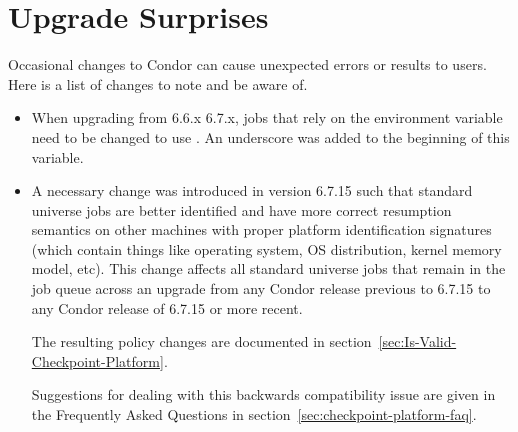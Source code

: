 \section{\label{sec:gotchas}Upgrade Surprises}

Occasional changes to Condor can cause unexpected errors or results
to users.
Here is a list of changes to note and be aware of.

\begin{itemize}

\item When upgrading from 6.6.x 6.7.x,
  jobs that rely on the environment variable 
  need to be changed to use .
  An underscore was added to the beginning of this variable.

\item A necessary change was introduced in version 6.7.15 such that
  standard universe jobs are better identified and have more
  correct resumption semantics on other machines with proper platform
  identification signatures (which contain things like operating system,
  OS distribution, kernel memory model, etc). This change affects all
  standard universe jobs that remain in the job queue across an upgrade
  from any Condor release previous to 6.7.15 to any Condor release of
  6.7.15 or more recent.

  The resulting policy changes are documented in
  section~\ref{sec:Is-Valid-Checkpoint-Platform}.

  Suggestions for dealing with this backwards compatibility issue
  are given in the Frequently Asked Questions in
  section~\ref{sec:checkpoint-platform-faq}.


\end{itemize}

